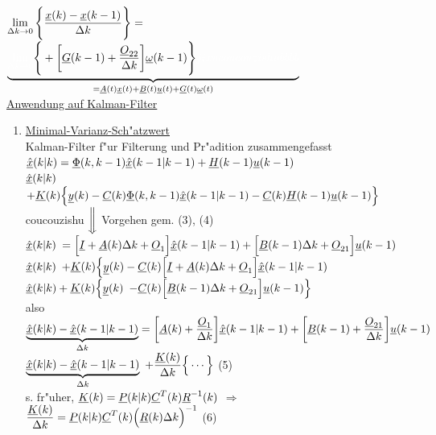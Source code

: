 \documentclass[openany,a4paper,11pt]{book}
\begin{document}
{\color{white}$\displaystyle\mathop{\text{lim}}\limits_{\Delta k\rightarrow0}\Bigg\{\frac{\uline{x}(k)-\uline{x}(k-1)}{\Delta k}\Bigg\}=$} $\underbrace{{\color{white}\mathop{\text{lim}}\limits_{\Delta k\rightarrow0}}\Bigg\{+\bigg[\uline{G}(k-1)+\frac{\uline{O}_{22}}{\Delta k}\bigg]\uline{\omega}(k-1)\Bigg\}{\color{white}jixucoucouzishubbbb}}_{=\uline{A}(t)\uline{x}(t)+\uline{B}(t)\uline{u}(t)+\uline{G}(t)\uline{\omega}(t)}$\\
\clearpage
\uline{Anwendung auf Kalman-Filter}\\\begin{enumerate}
    \item \uline{Minimal-Varianz-Sch"atzwert}\\
    Kalman-Filter f"ur Filterung und Pr"adition zusammengefasst\\
    $\uline{\hat{x}}(k|k)=\uline{\Phi}(k,k-1)\uline{\hat{x}}(k-1|k-1)+\uline{H}(k-1)\uline{u}(k-1)$\\
    {\color{white}$\uline{\hat{x}}(k|k)$} $+\uline{K}(k)\Big\{ \uline{y}(k)-\uline{C}(k)\uline{\Phi}(k,k-1)\uline{\hat{x}}(k-1|k-1)-\uline{C}(k)\uline{H}(k-1)\uline{u}(k-1)\Big\}$\\
    {\color{white} coucouzishu }$\bigg\Downarrow$ Vorgehen gem. (3), (4)\\
    {\color{white}$\uline{\hat{x}}(k|k)$} $=\Big[\uline{I}+\uline{A}(k)\Delta k +\uline{O}_1\Big]\uline{\hat{x}}(k-1|k-1)+\Big[\uline{B}(k-1)\Delta k+\uline{O}_{21}\Big]\uline{u}(k-1)$\\
    {\color{white}$\uline{\hat{x}}(k|k)$} $+\uline{K}(k)\Big\{ \uline{y}(k)-\uline{C}(k)\Big[\uline{I}+\uline{A}(k)\Delta k +\uline{O}_1\Big]\uline{\hat{x}}(k-1|k-1)$\\
    {\color{white}$\uline{\hat{x}}(k|k)+\uline{K}(k)\Big\{ \uline{y}(k)$} $-\uline{C}(k)\Big[\uline{B}(k-1)\Delta k+\uline{O}_{21}\Big]\uline{u}(k-1)\Big\}$\\
    also\\
    $\displaystyle\underbrace{\uline{\hat{x}}(k|k)-\uline{\hat{x}}(k-1|k-1)}_{\Delta k}=\bigg[\uline{A}(k)+\frac{\uline{O}_1}{\Delta k}\bigg]\uline{\hat{x}}(k-1|k-1)+\bigg[\uline{B}(k-1)+\frac{\uline{O}_{21}}{\Delta k}\bigg]\uline{u}(k-1)$\\
    {\color{white}$\displaystyle\underbrace{\uline{\hat{x}}(k|k)-\uline{\hat{x}}(k-1|k-1)}_{\Delta k}$} $\displaystyle+\frac{\uline{K}(k)}{\Delta k}\Big\{\cdots\Big\}$ \quad (5)\\
    s. fr"uher, $\uline{K}(k)=\uline{P}(k|k)\uline{C}^T(k)\uline{R}^{-1}(k)$ $\Rightarrow$ $\displaystyle\frac{\uline{K}(k)}{\Delta k}=\uline{P}(k|k)\uline{C}^T(k)\Big(\uline{R}(k)\Delta k\Big)^{-1}$ \quad (6)\\[3pt]

\end{enumerate}
\end{document}
